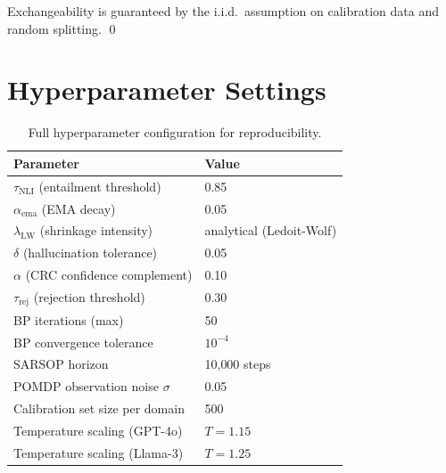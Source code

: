 Exchangeability is guaranteed by the i.i.d.\ assumption
on calibration data and random splitting. \qed

\section{Hyperparameter Settings}
\label{app:hyperparams}

\begin{table}[h]
\caption{Full hyperparameter configuration for reproducibility.}
\label{tab:hyperparams}
\centering
\begin{tabular}{ll}
\toprule
Parameter & Value \\
\midrule
$\tau_\text{NLI}$ (entailment threshold)    & 0.85 \\
$\alpha_\text{ema}$ (EMA decay)             & 0.05 \\
$\lambda_\text{LW}$ (shrinkage intensity)   & analytical (Ledoit-Wolf) \\
$\delta$ (hallucination tolerance)          & 0.05 \\
$\alpha$ (CRC confidence complement)        & 0.10 \\
$\tau_\text{rej}$ (rejection threshold)     & 0.30 \\
BP iterations (max)                         & 50 \\
BP convergence tolerance                    & $10^{-4}$ \\
SARSOP horizon                              & 10{,}000 steps \\
POMDP observation noise $\sigma$            & 0.05 \\
Calibration set size per domain             & 500 \\
Temperature scaling (GPT-4o)               & $T = 1.15$ \\
Temperature scaling (Llama-3)              & $T = 1.25$ \\
\bottomrule
\end{tabular}
\end{table}

